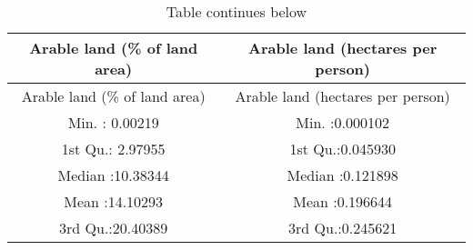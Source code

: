 \documentclass[
]{article}
\begin{document}
\begin{longtable}[]{@{}cc@{}}
\caption{Table continues below}\tabularnewline
\toprule
\begin{minipage}[b]{0.41\columnwidth}\centering
Arable land (\% of land area)\strut
\end{minipage} & \begin{minipage}[b]{0.37\columnwidth}\centering
Arable land (hectares per person)\strut
\end{minipage}\tabularnewline
\midrule
\endfirsthead
\toprule
\begin{minipage}[b]{0.41\columnwidth}\centering
Arable land (\% of land area)\strut
\end{minipage} & \begin{minipage}[b]{0.37\columnwidth}\centering
Arable land (hectares per person)\strut
\end{minipage}\tabularnewline
\midrule
\endhead
\begin{minipage}[t]{0.41\columnwidth}\centering
Min. : 0.00219\strut
\end{minipage} & \begin{minipage}[t]{0.37\columnwidth}\centering
Min. :0.000102\strut
\end{minipage}\tabularnewline
\begin{minipage}[t]{0.41\columnwidth}\centering
1st Qu.: 2.97955\strut
\end{minipage} & \begin{minipage}[t]{0.37\columnwidth}\centering
1st Qu.:0.045930\strut
\end{minipage}\tabularnewline
\begin{minipage}[t]{0.41\columnwidth}\centering
Median :10.38344\strut
\end{minipage} & \begin{minipage}[t]{0.37\columnwidth}\centering
Median :0.121898\strut
\end{minipage}\tabularnewline
\begin{minipage}[t]{0.41\columnwidth}\centering
Mean :14.10293\strut
\end{minipage} & \begin{minipage}[t]{0.37\columnwidth}\centering
Mean :0.196644\strut
\end{minipage}\tabularnewline
\begin{minipage}[t]{0.41\columnwidth}\centering
3rd Qu.:20.40389\strut
\end{minipage} & \begin{minipage}[t]{0.37\columnwidth}\centering
3rd Qu.:0.245621\strut

\end{minipage}
\end{longtable}
\end{document}
